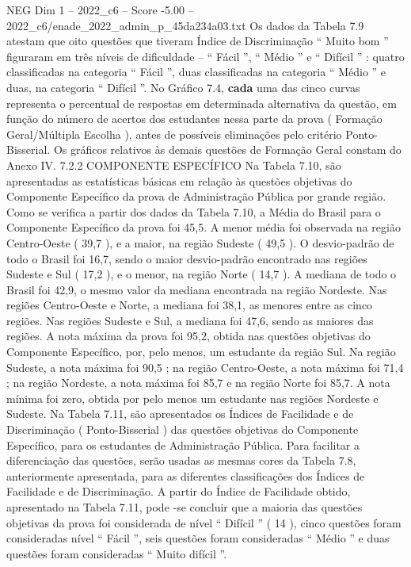 \begin{textsample}{NEG Dim 1 – 2022\_c6 – Score -5.00 – 2022\_c6/enade\_2022\_admin\_p\_45da234a03.txt}
Os dados da Tabela 7.9 atestam que oito questões que tiveram Índice de Discriminação “ Muito bom ” figuraram em três níveis de dificuldade – “ Fácil ”, “ Médio ” e “ Difícil ” : quatro classificadas na categoria “ Fácil ”, duas classificadas na categoria “ Médio ” e duas, na categoria “ Difícil ”.
No Gráfico 7.4, \textbf{cada} uma das cinco curvas representa o percentual de respostas em determinada alternativa da questão, em função do número de acertos dos estudantes nessa parte da prova ( Formação Geral/Múltipla Escolha ), antes de possíveis eliminações pelo critério Ponto-Bisserial.
Os gráficos relativos às demais questões de Formação Geral constam do Anexo IV. 7.2.2 COMPONENTE ESPECÍFICO Na Tabela 7.10, são apresentadas as estatísticas básicas em relação às questões objetivas do Componente Específico da prova de Administração Pública por grande região.
Como se verifica a partir dos dados da Tabela 7.10, a Média do Brasil para o Componente Específico da prova foi 45,5.
A menor média foi observada na região Centro-Oeste ( 39,7 ), e a maior, na região Sudeste ( 49,5 ).
O desvio-padrão de todo o Brasil foi 16,7, sendo o maior desvio-padrão encontrado nas regiões Sudeste e Sul ( 17,2 ), e o menor, na região Norte ( 14,7 ).
A mediana de todo o Brasil foi 42,9, o mesmo valor da mediana encontrada na região Nordeste.
Nas regiões Centro-Oeste e Norte, a mediana foi 38,1, as menores entre as cinco regiões.
Nas regiões Sudeste e Sul, a mediana foi 47,6, sendo as maiores das regiões.
A nota máxima da prova foi 95,2, obtida nas questões objetivas do Componente Específico, por, pelo menos, um estudante da região Sul.
Na região Sudeste, a nota máxima foi 90,5 ; na região Centro-Oeste, a nota máxima foi 71,4 ; na região Nordeste, a nota máxima foi 85,7 e na região Norte foi 85,7.
A nota mínima foi zero, obtida por pelo menos um estudante nas regiões Nordeste e Sudeste.
Na Tabela 7.11, são apresentados os Índices de Facilidade e de Discriminação ( Ponto-Bisserial ) das questões objetivas do Componente Específico, para os estudantes de Administração Pública.
Para facilitar a diferenciação das questões, serão usadas as mesmas cores da Tabela 7.8, anteriormente apresentada, para as diferentes classificações dos Índices de Facilidade e de Discriminação.
A partir do Índice de Facilidade obtido, apresentado na Tabela 7.11, pode -se concluir que a maioria das questões objetivas da prova foi considerada de nível “ Difícil ” ( 14 ), cinco questões foram consideradas nível “ Fácil ”, seis questões foram consideradas “ Médio ” e duas questões foram consideradas “ Muito difícil ”.

\end{textsample}
